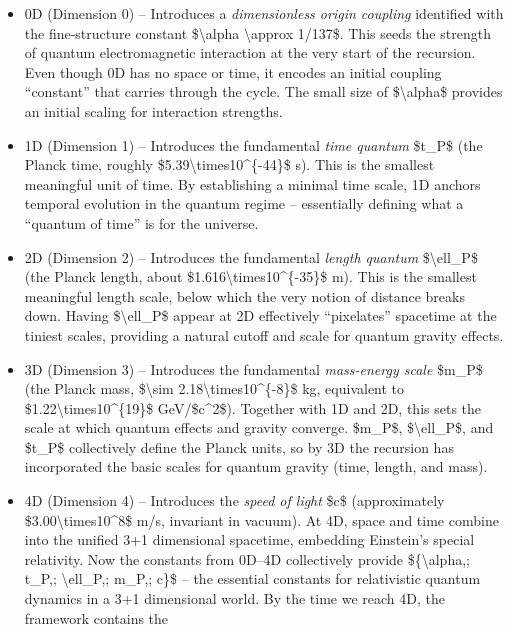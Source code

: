 \documentclass[
]{article}
\begin{document}
\begin{itemize}
\item
  0D (Dimension 0) -- Introduces a \emph{dimensionless origin coupling}
  identified with the fine-structure constant \$\textbackslash alpha
  \textbackslash approx 1/137\$. This seeds the strength of quantum
  electromagnetic interaction at the very start of the recursion. Even
  though 0D has no space or time, it encodes an initial coupling
  ``constant'' that carries through the cycle. The small size of
  \$\textbackslash alpha\$ provides an initial scaling for interaction
  strengths.
\item
  1D (Dimension 1) -- Introduces the fundamental \emph{time quantum}
  \$t\_P\$ (the Planck time, roughly
  \$5.39\textbackslash times10\^{}\{-44\}\$ s). This is the smallest
  meaningful unit of time. By establishing a minimal time scale, 1D
  anchors temporal evolution in the quantum regime -- essentially
  defining what a ``quantum of time'' is for the universe.
\item
  2D (Dimension 2) -- Introduces the fundamental \emph{length quantum}
  \$\textbackslash ell\_P\$ (the Planck length, about
  \$1.616\textbackslash times10\^{}\{-35\}\$ m). This is the smallest
  meaningful length scale, below which the very notion of distance
  breaks down. Having \$\textbackslash ell\_P\$ appear at 2D effectively
  ``pixelates'' spacetime at the tiniest scales, providing a natural
  cutoff and scale for quantum gravity effects.
\item
  3D (Dimension 3) -- Introduces the fundamental \emph{mass-energy
  scale} \$m\_P\$ (the Planck mass, \$\textbackslash sim
  2.18\textbackslash times10\^{}\{-8\}\$ kg, equivalent to
  \$1.22\textbackslash times10\^{}\{19\}\$ GeV/\$c\^{}2\$). Together
  with 1D and 2D, this sets the scale at which quantum effects and
  gravity converge. \$m\_P\$, \$\textbackslash ell\_P\$, and \$t\_P\$
  collectively define the Planck units, so by 3D the recursion has
  incorporated the basic scales for quantum gravity (time, length, and
  mass).
\item
  4D (Dimension 4) -- Introduces the \emph{speed of light} \$c\$
  (approximately \$3.00\textbackslash times10\^{}8\$ m/s, invariant in
  vacuum). At 4D, space and time combine into the unified 3+1
  dimensional spacetime, embedding Einstein's special relativity. Now
  the constants from 0D--4D collectively provide
  \$\{\textbackslash alpha,; t\_P,; \textbackslash ell\_P,; m\_P,; c\}\$
  -- the essential constants for relativistic quantum dynamics in a 3+1
  dimensional world. By the time we reach 4D, the framework contains the

\end{itemize}
\end{document}
